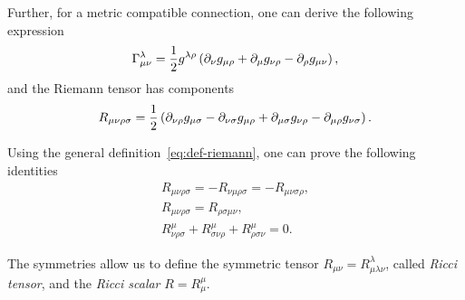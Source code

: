 Further, for a metric compatible connection, one can derive the following expression
\begin{equation}
    \Gamma^\lambda_{\mu\nu} = \frac{1}{2} g^{\lambda\rho} \left( \partial_\nu g_{\mu\rho} + \partial_\mu g_{\nu\rho} - \partial_\rho g_{\mu\nu} \right),
\end{equation}
and the Riemann tensor has components
\begin{equation}
    R_{\mu\nu\rho\sigma} = \frac{1}{2} \left( \partial_{\nu\rho} g_{\mu\sigma} - \partial_{\nu\sigma} g_{\mu\rho} + \partial_{\mu\sigma} g_{\nu\rho} - \partial_{\mu\rho} g_{\nu\sigma} \right) .
\end{equation}

Using the general definition~\eqref{eq:def-riemann}, one can prove the following identities
\begin{subequations}
\begin{gather}
    R_{\mu\nu\rho\sigma} = - R_{\nu\mu\rho\sigma} = - R_{\mu\nu\sigma\rho}, \\
    R_{\mu\nu\rho\sigma} = R_{\rho\sigma\mu\nu}, \\
    R^\mu_{\nu\rho\sigma} + R^\mu_{\sigma\nu\rho} + R^\mu_{\rho\sigma\nu} = 0.
\end{gather}
\end{subequations}

The symmetries allow us to define the symmetric tensor $R_{\mu\nu} = R^\lambda_{\mu\lambda\nu}$, called \emph{Ricci tensor}, and the \emph{Ricci scalar} $R = R^\mu_\mu$.